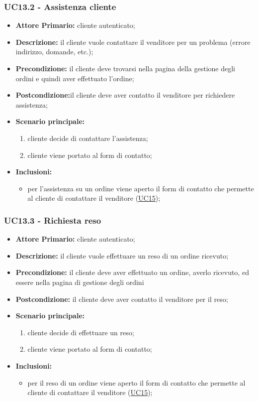\subsubsection{UC13.2 - Assistenza cliente}
\label{UC13.2}
\begin{itemize}
\item \textbf{Attore Primario:} cliente autenticato;
\item \textbf{Descrizione:} il cliente vuole contattare il venditore per un problema (errore indirizzo, domande, etc.);
\item \textbf{Precondizione:} il cliente deve trovarsi nella pagina della gestione degli ordini e quindi aver effettuato l'ordine;
\item \textbf{Postcondizione:}il cliente deve aver contatto il venditore per richiedere assistenza;
\item \textbf{Scenario principale:}
\begin{enumerate}
    \item cliente decide di contattare l'assistenza;
    \item cliente viene portato al form di contatto;
\end{enumerate}
\item \textbf{Inclusioni:}
\begin{itemize}
    \item per l'assistenza su un ordine viene aperto il form di contatto che permette al cliente di contattare il venditore (\hyperref[UC15]{UC15});
\end{itemize}
\end{itemize}

\subsubsection{UC13.3 - Richiesta reso}
\label{UC13.3}
\begin{itemize}
\item \textbf{Attore Primario:} cliente autenticato;
\item \textbf{Descrizione:} il cliente vuole effettuare un reso di un ordine ricevuto;
\item \textbf{Precondizione:} il cliente deve aver effettuato un ordine, averlo ricevuto, ed essere nella pagina di gestione degli ordini
\item \textbf{Postcondizione:} il cliente deve aver contatto il venditore per il reso;
\item \textbf{Scenario principale:}
\begin{enumerate}
    \item cliente decide di effettuare un reso;
    \item cliente viene portato al form di contatto;
\end{enumerate}
\item \textbf{Inclusioni:}
\begin{itemize}
    \item per il reso di un ordine viene aperto il form di contatto che permette al cliente di contattare il venditore (\hyperref[UC15]{UC15});
\end{itemize}
\end{itemize}

